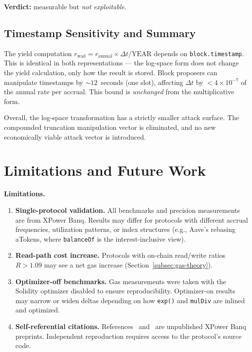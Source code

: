 \documentclass[10pt,a4paper,twocolumn]{article}
\begin{document}
\textbf{Verdict:} measurable but \emph{not exploitable}.

\subsection{Timestamp Sensitivity and Summary}
\label{subsec:timestamp}

The yield computation $r_{\text{wad}} = r_{\text{annual}} \times \Delta t / \text{YEAR}$ depends on \texttt{block.timestamp}. This is identical in both representations --- the log-space form does not change the yield calculation, only how the result is stored. Block proposers can manipulate timestamps by ${\sim}12$~seconds (one slot), affecting $\Delta t$ by $< 4 \times 10^{-7}$ of the annual rate per accrual. This bound is \emph{unchanged} from the multiplicative form.

Overall, the log-space transformation has a strictly smaller attack surface. The compounded truncation manipulation vector is eliminated, and no new economically viable attack vector is introduced.

\section{Limitations and Future Work}
\label{sec:limitations}

\noindent\textbf{Limitations.}

\begin{enumerate}[leftmargin=*, nosep]
\item \textbf{Single-protocol validation.} All benchmarks and precision measurements are from XPower Banq. Results may differ for protocols with different accrual frequencies, utilization patterns, or index structures (e.g., Aave's rebasing aTokens, where \texttt{balanceOf} is the interest-inclusive view).

\item \textbf{Read-path cost increase.} Protocols with on-chain read/write ratios $R > 1.09$ may see a net gas increase (Section~\ref{subsec:gas-theory}).

\item \textbf{Optimizer-off benchmarks.} Gas measurements were taken with the Solidity optimizer disabled to ensure reproducibility. Optimizer-on results may narrow or widen deltas depending on how \texttt{exp()} and \texttt{mulDiv} are inlined and optimized.

\item \textbf{Self-referential citations.} References~\cite{wp} and~\cite{lck} are unpublished XPower Banq preprints. Independent reproduction requires access to the protocol's source code.
\end{enumerate}
\end{document}
